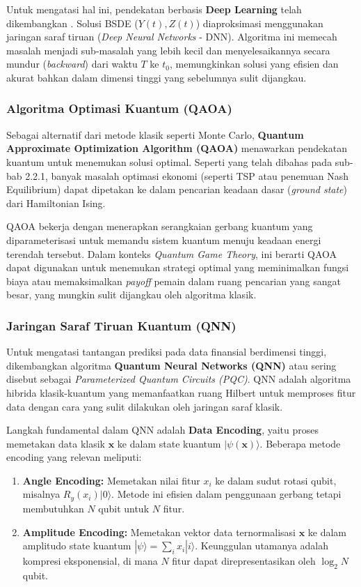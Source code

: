 Untuk mengatasi hal ini, pendekatan berbasis \textbf{Deep Learning} telah dikembangkan \citep{wang_deep_2018}. Solusi BSDE ($Y(t), Z(t)$) diaproksimasi menggunakan jaringan saraf tiruan (\textit{Deep Neural Networks} - DNN). Algoritma ini memecah masalah menjadi sub-masalah yang lebih kecil dan menyelesaikannya secara mundur (\textit{backward}) dari waktu $T$ ke $t_0$, memungkinkan solusi yang efisien dan akurat bahkan dalam dimensi tinggi yang sebelumnya sulit dijangkau.

\subsubsection{Algoritma Optimasi Kuantum (QAOA)}
Sebagai alternatif dari metode klasik seperti Monte Carlo, \textbf{Quantum Approximate Optimization Algorithm (QAOA)} menawarkan pendekatan kuantum untuk menemukan solusi optimal. Seperti yang telah dibahas pada sub-bab 2.2.1, banyak masalah optimasi ekonomi (seperti TSP atau penemuan Nash Equilibrium) dapat dipetakan ke dalam pencarian keadaan dasar (\textit{ground state}) dari Hamiltonian Ising.

QAOA bekerja dengan menerapkan serangkaian gerbang kuantum yang diparameterisasi untuk memandu sistem kuantum menuju keadaan energi terendah tersebut. Dalam konteks \textit{Quantum Game Theory}, ini berarti QAOA dapat digunakan untuk menemukan strategi optimal yang meminimalkan fungsi biaya atau memaksimalkan \textit{payoff} pemain dalam ruang pencarian yang sangat besar, yang mungkin sulit dijangkau oleh algoritma klasik.

\subsubsection{Jaringan Saraf Tiruan Kuantum (QNN)}

Untuk mengatasi tantangan prediksi pada data finansial berdimensi tinggi, dikembangkan algoritma \textbf{Quantum Neural Networks (QNN)} atau sering disebut sebagai \textit{Parameterized Quantum Circuits (PQC)}. QNN adalah algoritma hibrida klasik-kuantum yang memanfaatkan ruang Hilbert untuk memproses fitur data dengan cara yang sulit dilakukan oleh jaringan saraf klasik.

Langkah fundamental dalam QNN adalah \textbf{Data Encoding}, yaitu proses memetakan data klasik $\mathbf{x}$ ke dalam state kuantum $|\psi(\mathbf{x})\rangle$. Beberapa metode encoding yang relevan meliputi:

\begin{enumerate}
    \item \textbf{Angle Encoding:} Memetakan nilai fitur $x_i$ ke dalam sudut rotasi qubit, misalnya $R_y(x_i)|0\rangle$. Metode ini efisien dalam penggunaan gerbang tetapi membutuhkan $N$ qubit untuk $N$ fitur.
    \item \textbf{Amplitude Encoding:} Memetakan vektor data ternormalisasi $\mathbf{x}$ ke dalam amplitudo state kuantum $|\psi\rangle = \sum_{i} x_i |i\rangle$. Keunggulan utamanya adalah kompresi eksponensial, di mana $N$ fitur dapat direpresentasikan oleh $\log_2 N$ qubit.
\end{enumerate}

